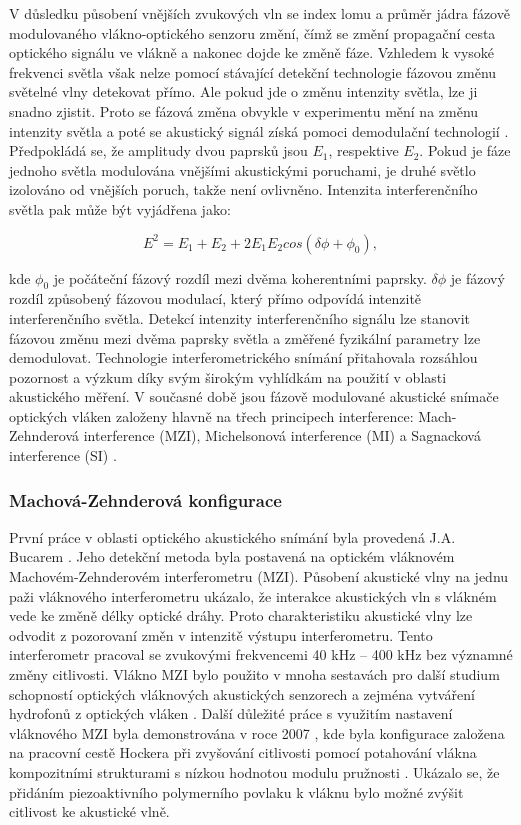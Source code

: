 V důsledku působení vnějších zvukových vln se index lomu a průměr jádra fázově modulovaného vlákno-optického senzoru změní, čímž se změní propagační cesta optického signálu ve vlákně a nakonec dojde ke změně fáze. Vzhledem k vysoké frekvenci světla však nelze pomocí stávající detekční technologie fázovou změnu světelné vlny detekovat přímo. Ale pokud jde o změnu intenzity světla, lze ji snadno zjistit. Proto se fázová změna obvykle v experimentu mění na změnu intenzity světla a poté se akustický signál získá pomoci demodulační technologií \cite{337}. 
Předpokládá se, že amplitudy dvou paprsků jsou $E_1$, respektive $E_2$. Pokud je fáze jednoho světla modulována vnějšími akustickými poruchami, je druhé světlo izolováno od vnějších poruch, takže není ovlivněno. Intenzita interferenčního světla pak může být vyjádřena jako:

\begin{equation}
E^2 = E_1 + E_2 + 2E_1E_2cos(\delta\phi + \phi_0),
\end{equation}

kde $\phi_0$ je počáteční fázový rozdíl mezi dvěma koherentními paprsky. $\delta\phi$ je fázový rozdíl způsobený fázovou modulací, který přímo odpovídá intenzitě interferenčního světla. Detekcí intenzity interferenčního signálu lze stanovit fázovou změnu mezi dvěma paprsky světla a změřené fyzikální parametry lze demodulovat. Technologie interferometrického snímání přitahovala rozsáhlou pozornost a výzkum díky svým širokým vyhlídkám na použití v oblasti  akustického měření. V současné době jsou fázově modulované akustické snímače optických vláken založeny hlavně na třech principech interference: Mach-Zehnderová interference (MZI), Michelsonová interference (MI) a Sagnacková interference (SI) \cite{338}.

\subsubsection{Machová-Zehnderová konfigurace}

První práce v oblasti optického akustického snímání byla provedená J.A. Bucarem \cite{21}. Jeho detekční metoda byla postavená na optickém vláknovém Machovém-Zehnderovém interferometru (MZI). Působení akustické vlny na jednu paži vláknového interferometru ukázalo, že interakce akustických vln s vlákném vede ke změně délky optické dráhy. Proto charakteristiku akustické vlny lze odvodit z pozorovaní změn v intenzitě výstupu interferometru. Tento interferometr pracoval se zvukovými frekvencemi 40 kHz -- 400 kHz bez významné změny citlivosti. Vlákno MZI bylo použito v mnoha sestavách pro další studium schopností optických vláknových akustických senzorech a zejména vytváření hydrofonů z optických vláken \cite{211}. Další důležité práce s využitím nastavení vláknového MZI byla demonstrována v roce 2007 \cite{212}, kde byla konfigurace založena na pracovní cestě Hockera při zvyšování citlivosti pomocí potahování vlákna kompozitními strukturami s nízkou hodnotou modulu pružnosti . Ukázalo se, že přidáním piezoaktivního polymerního povlaku k vláknu bylo možné zvýšit citlivost ke akustické vlně\cite{213}. 

